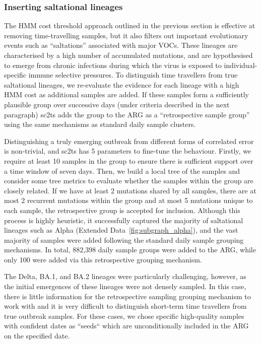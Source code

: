 \documentclass[12pt]{article}
\newcommand{\edref}[1]{Extended Data~\ref{#1}}
\begin{document}
\subsubsection*{Inserting saltational lineages}
The HMM cost threshold approach outlined in the previous section is
effective at removing time-travelling samples, but it also filters out
important evolutionary events such as
``saltations'' associated with major VOCs.
These lineages are characterised by a high number of accumulated mutations,
and are hypothesised to emerge from chronic infections
during which the virus is exposed to individual-specific immune selective
pressures\cite{Otto2021origins,Markov2023}.
To distinguish time travellers from true saltational lineages,
we re-evaluate the evidence for each lineage with a high HMM cost
as additional samples are added.
If these samples form a sufficiently plausible group over successive days
(under criteria described in the next paragraph)
sc2ts adds the group to the ARG as a
``retrospective sample group'' using the same mechanisms
as standard daily sample clusters.

Distinguishing a truly emerging outbreak from different forms of
correlated error is non-trivial, and
sc2ts has 5 parameters to fine-tune the behaviour.
Firstly, we require at least 10 samples in the
group to ensure there is sufficient support over a time window of
seven days. Then, we build a local tree of the samples and consider
some tree metrics to evaluate whether the samples within the
group are closely related. If we have at least 2 mutations
shared by all samples, there are at most 2 recurrent mutations
within the group and at most 5 mutations unique to each sample,
the retrospective group is accepted for inclusion.
Although this process is highly heuristic, it successfully
captured the majority of saltational lineages
such as Alpha (\edref{fig:subgraph_alpha}), and the
vast majority of samples were added following the standard
daily sample grouping mechanisms.
In total, 882,398 daily
sample groups were added to the ARG, while only 100 were
added via this retrospective grouping mechanism.

The Delta, BA.1, and BA.2 lineages were
particularly challenging, however, as the initial emergences of
these lineages were not densely sampled. In this case,
there is little information for the retrospective sampling grouping mechanism
to work with and it is very difficult to distinguish short-term time travellers
from true outbreak samples. For these cases, we chose specific
high-quality samples with confident dates as ``seeds`` which are
unconditionally included in the ARG on the specified date.
\end{document}
